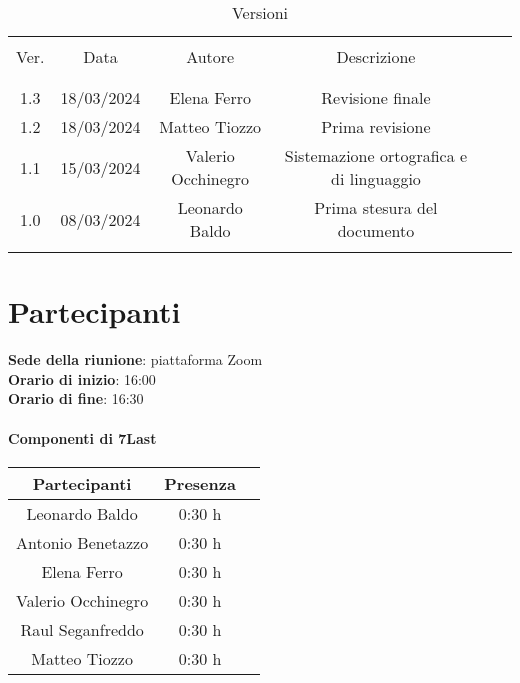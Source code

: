 \documentclass[italian,12pt]{article} %
\begin{document}


\newpage





\begin{table}[!h]
	\caption{Versioni}
	\begin{center}
		\begin{tabular}{ c c c c c c }
			\hline \\[-2ex]
			Ver. & Data & Autore & Descrizione \\
			\\[-2ex] \hline \\[-1.5ex]
			1.3 & 18/03/2024 & Elena Ferro & Revisione finale\\
			1.2 & 18/03/2024 & Matteo Tiozzo & Prima revisione \\
			1.1 & 15/03/2024 & Valerio Occhinegro& Sistemazione ortografica e di linguaggio \\
			1.0 & 08/03/2024 & Leonardo Baldo& Prima stesura del documento \\
			\\[-1.5ex] \hline
		\end{tabular}
	\end{center}
\end{table}
\newpage

\tableofcontents

\newpage

\section{Partecipanti}

\textbf{Sede della riunione}: piattaforma Zoom\\
\textbf{Orario di inizio}: 16:00\\
\textbf{Orario di fine}: 16:30\\


\paragraph{Componenti di 7Last}

\begin{flushleft}
\begin{table}[!h]
\begin{tabular}{ |c|c|c| } 
	\hline
	\textbf{Partecipanti} & \textbf{Presenza} \\
	\hline 
	Leonardo Baldo 		 & 0:30 h \\ 
	Antonio Benetazzo 	 & 0:30 h \\
	Elena Ferro 		 & 0:30 h \\
	Valerio Occhinegro 	 & 0:30 h \\
	Raul Seganfreddo 	 & 0:30 h \\
	Matteo Tiozzo 		 & 0:30 h \\ 
	\hline
\end{tabular}
\end{table}
\end{flushleft}
\end{document}
